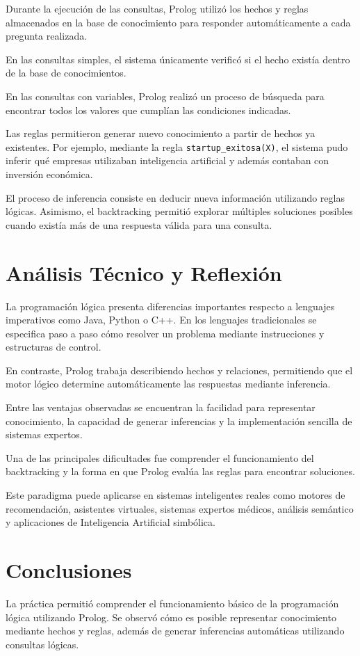 \documentclass[12pt,a4paper]{article}
\begin{document}
Durante la ejecución de las consultas, Prolog utilizó los hechos y reglas almacenados en la base de conocimiento para responder automáticamente a cada pregunta realizada.

En las consultas simples, el sistema únicamente verificó si el hecho existía dentro de la base de conocimientos.

En las consultas con variables, Prolog realizó un proceso de búsqueda para encontrar todos los valores que cumplían las condiciones indicadas.

Las reglas permitieron generar nuevo conocimiento a partir de hechos ya existentes. Por ejemplo, mediante la regla \texttt{startup\_exitosa(X)}, el sistema pudo inferir qué empresas utilizaban inteligencia artificial y además contaban con inversión económica.

El proceso de inferencia consiste en deducir nueva información utilizando reglas lógicas. Asimismo, el backtracking permitió explorar múltiples soluciones posibles cuando existía más de una respuesta válida para una consulta.

\section{Análisis Técnico y Reflexión}

La programación lógica presenta diferencias importantes respecto a lenguajes imperativos como Java, Python o C++. En los lenguajes tradicionales se especifica paso a paso cómo resolver un problema mediante instrucciones y estructuras de control.

En contraste, Prolog trabaja describiendo hechos y relaciones, permitiendo que el motor lógico determine automáticamente las respuestas mediante inferencia.

Entre las ventajas observadas se encuentran la facilidad para representar conocimiento, la capacidad de generar inferencias y la implementación sencilla de sistemas expertos.

Una de las principales dificultades fue comprender el funcionamiento del backtracking y la forma en que Prolog evalúa las reglas para encontrar soluciones.

Este paradigma puede aplicarse en sistemas inteligentes reales como motores de recomendación, asistentes virtuales, sistemas expertos médicos, análisis semántico y aplicaciones de Inteligencia Artificial simbólica.

\section{Conclusiones}

La práctica permitió comprender el funcionamiento básico de la programación lógica utilizando Prolog. Se observó cómo es posible representar conocimiento mediante hechos y reglas, además de generar inferencias automáticas utilizando consultas lógicas.
\end{document}
